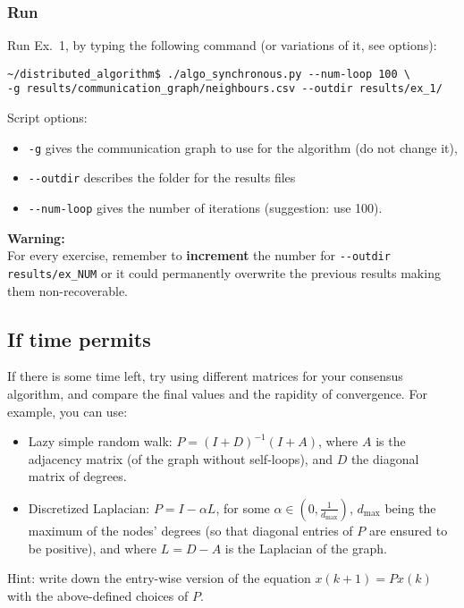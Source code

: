 \documentclass[oneside]{article}
\begin{document}
        
\subsubsection{Run} %
Run Ex.~1, by typing the following command (or variations of it, see options):

\begin{verbatim}
~/distributed_algorithm$ ./algo_synchronous.py --num-loop 100 \
-g results/communication_graph/neighbours.csv --outdir results/ex_1/
\end{verbatim}


Script options:
\begin{itemize}
	\item \verb=-g= gives the communication graph to use for the algorithm (do not change it),
	\item \verb=--outdir= describes the folder for the results files
    \item \verb=--num-loop=  gives the number of iterations (suggestion: use 100).
\end{itemize}

\textbf{Warning:} \\
For every exercise, remember to \textbf{increment} the number for \verb=--outdir results/ex_NUM=
or it could permanently overwrite the previous results making them non-recoverable.




\subsection{If time permits}
If there is some time left, try using different matrices for your consensus algorithm, and compare the final values and the rapidity of convergence. For example, you can use:
\begin{itemize}
\item Lazy simple random walk: $P = (I+D)^{-1} (I+A)$, where $A$ is the adjacency matrix (of the graph without self-loops), and $D$ the diagonal matrix of degrees.
\item Discretized Laplacian:  $P = I - \alpha L$, for some $\alpha \in (0,\frac{1}{d_{\max}})$, $d_{\max}$ being the maximum of the nodes' degrees (so that diagonal entries of $P$ are ensured to be positive), and where $L=D-A$ is the Laplacian of the graph.
\end{itemize}
Hint: write down the entry-wise version of the equation $x(k+1) = P x(k)$ with the above-defined choices of $P$.
\end{document}
